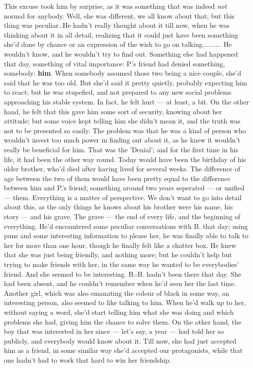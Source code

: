 This excuse took him by surprise, as it was something that was indeed \emph{not} normal for anybody. Well, she was different, we all know about that; but this thing was peculiar. He hadn't really thought about it till now, when he was thinking about it in all detail, realizing that it could just have been something she'd done by chance or an expression of the wish to go on talking..........
He wouldn't know, and he wouldn't try to find out. Something else had happened that day, something of vital importance: 
P.'s friend had denied something, somebody: \textbf{him}. When somebody assumed those two being a nice couple, she'd said that he was too old. 
But she'd said it pretty quietly, probably expecting him to react; but he was stupefied, and not prepared to any new social problems approaching his stable system. In fact, he felt hurt --- at least, a bit. On the other hand, he felt that this gave him some sort of security, knowing about her attitude; but some voice kept telling him she didn't mean it, and the truth was not to be presented so easily. The problem was that he was a kind of person who wouldn't invest too much power in finding out about it, as he knew it wouldn't really be beneficial for him. 
That was the 'Denial'; and for the first time in his life, it had been the other way round. Today would have been the birthday of his older brother, who'd died after having lived for several weeks. 
The difference of age between the two of them would have been pretty equal to the difference between him and P.'s friend; something around two years seperated --- or unified --- them. 
Everything is a matter of perspective. 
We don't want to go into detail about this, as the only things he knows about his brother were his name, his story --- and his grave. 
The grave --- the end of every life, and the beginning of everything. 
He'd encountered some peculiar conversations with B. that day; using puns and some interesting information to please her, he was finally able to talk to her for more than one hour, though he finally felt like a chatter box. He knew that she was just being friendly, and nothing more; but he couldn't help but trying to make friends with her, in the same way he wanted to be everybodies' friend. And she seemed to be interesting. 
B.-B. hadn't been there that day. She had been absent, and he couldn't remember when he'd seen her the last time. 
Another girl, which was also emanating the colour of black in some way, an interesting person, also seemed to like talking to him. When he'd walk up to her, without saying a word, she'd start telling him what she was doing and which problems she had, giving him the chance to solve them. On the other hand, the boy that was interested in her since --- let's say, a year --- had told her so publicly, and everybody would know about it. Till now, she had just accepted him as a friend, in some similar way she'd accepted our protagonists, while that one hadn't had to work that hard to win her friendship. 
